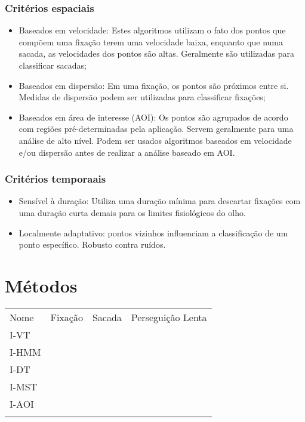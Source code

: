 \subsubsection{Critérios espaciais}\label{crituxe9rios-espaciais}

\begin{itemize}
\itemsep1pt\parskip0pt
\item
  Baseados em velocidade: Estes algoritmos utilizam o fato dos pontos
  que compõem uma fixação terem uma velocidade baixa, enquanto que numa
  sacada, as velocidades dos pontos são altas. Geralmente são utilizadas
  para classificar sacadas;
\item
  Baseados em dispersão: Em uma fixação, os pontos são próximos entre
  si. Medidas de dispersão podem ser utilizadas para classificar
  fixações;
\item
  Baseados em área de interesse (AOI): Os pontos são agrupados de acordo
  com regiões pré-determinadas pela aplicação. Servem geralmente para
  uma análise de alto nível. Podem ser usados algoritmos baseados em
  velocidade e/ou dispersão antes de realizar a análise baseado em AOI.
\end{itemize}

\subsubsection{Critérios temporaais}\label{crituxe9rios-temporaais}

\begin{itemize}
\itemsep1pt\parskip0pt
\item
  Sensível à duração: Utiliza uma duração mínima para descartar fixações
  com uma duração curta demais para os limites fisiológicos do olho.
\item
  Localmente adaptativo: pontos vizinhos influenciam a classificação de
  um ponto específico. Robusto contra ruídos.
\end{itemize}

\section{Métodos}\label{muxe9todos}

\begin{longtable}[c]{@{}llll@{}}
\hline\noalign{\medskip}
Nome & Fixação & Sacada & Perseguição Lenta
\\\noalign{\medskip}
\hline\noalign{\medskip}
I-VT & & &
\\\noalign{\medskip}
I-HMM & & &
\\\noalign{\medskip}
I-DT & & &
\\\noalign{\medskip}
I-MST & & &
\\\noalign{\medskip}
I-AOI & & &
\\\noalign{\medskip}
\hline
\end{longtable}

